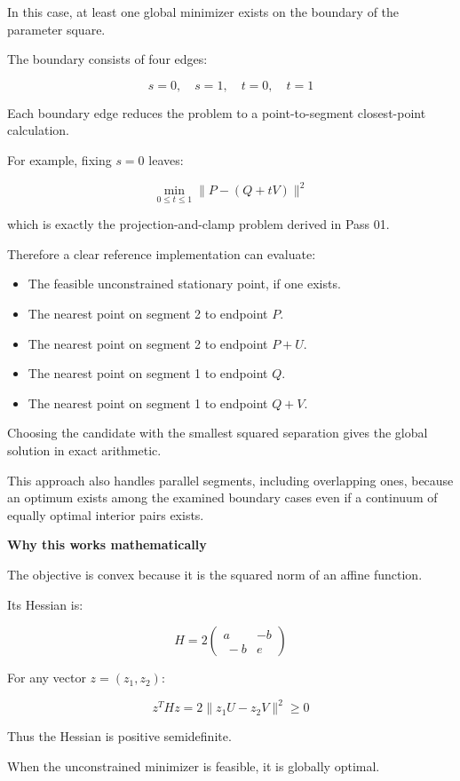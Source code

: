In this case, at least one global minimizer exists on the boundary of the parameter square.

The boundary consists of four edges:

\[
s=0,\quad s=1,\quad t=0,\quad t=1
\]

Each boundary edge reduces the problem to a point-to-segment closest-point calculation.

For example, fixing \(s=0\) leaves:

\[
\min_{0\le t\le1}\|P-(Q+tV)\|^2
\]

which is exactly the projection-and-clamp problem derived in Pass 01.

Therefore a clear reference implementation can evaluate:

\begin{itemize}
\tightlist
\item
  The feasible unconstrained stationary point, if one exists.
\item
  The nearest point on segment 2 to endpoint \(P\).
\item
  The nearest point on segment 2 to endpoint \(P+U\).
\item
  The nearest point on segment 1 to endpoint \(Q\).
\item
  The nearest point on segment 1 to endpoint \(Q+V\).
\end{itemize}

Choosing the candidate with the smallest squared separation gives the global solution in exact arithmetic.

This approach also handles parallel segments, including overlapping ones, because an optimum exists among the examined boundary cases even if a continuum of equally optimal interior pairs exists.

\textbf{Why this works mathematically}

The objective is convex because it is the squared norm of an affine function.

Its Hessian is:

\[
H= 2\begin{pmatrix} a&-b\\\ -b&e \end{pmatrix}
\]

For any vector \(z=(z_1,z_2)\):

\[
z^THz = 2\|z_1U-z_2V\|^2\ge0
\]

Thus the Hessian is positive semidefinite.

When the unconstrained minimizer is feasible, it is globally optimal.

